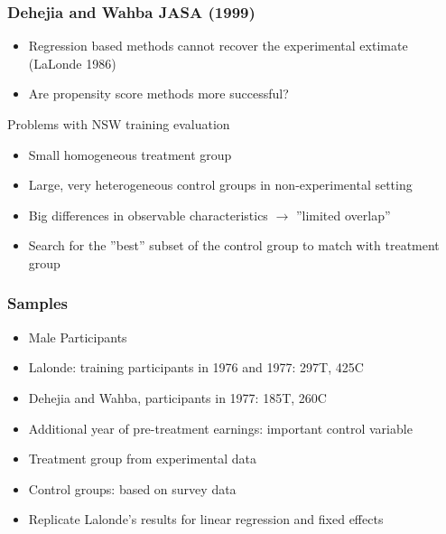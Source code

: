 \documentclass[notes=show,beamer,compress]{beamer}
\begin{document}

\begin{frame}
\frametitle{Dehejia and Wahba JASA (1999)}


\begin{itemize}
	\item Regression based methods cannot recover the experimental extimate (LaLonde 1986)
	\item Are propensity score methods more successful?
\end{itemize}

Problems with NSW training evaluation
\begin{itemize}
	\item Small homogeneous treatment group 
	\item Large, very heterogeneous control groups in non-experimental setting
	\item Big differences in observable characteristics $\rightarrow$ ''limited overlap'' 
	\item Search for the ''best'' subset of the control group to match with treatment group
\end{itemize}


\end{frame}



\begin{frame}
\frametitle{Samples}

\begin{itemize}
	\item Male Participants
	\item Lalonde: training participants in 1976 and 1977: 297T, 425C
	\item Dehejia and Wahba, participants in 1977: 185T, 260C
	\item Additional year of pre-treatment earnings: important control variable
	\item Treatment group from experimental data
	\item Control groups: based on survey data
	\item Replicate Lalonde's results for linear regression and fixed effects
\end{itemize}

\end{frame}
\end{document}
